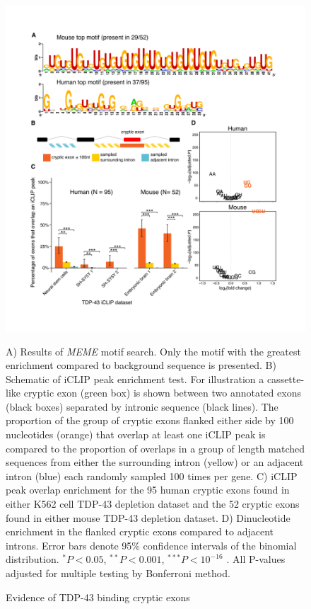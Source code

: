 \begin{figure}[h!]
	\begin{center}
		\includegraphics[width=14cm]{Figures/03_cryptic_exons/Figure_2_motif_iCLIP.png} 
	\end{center}
	\caption{Evidence of TDP-43 binding cryptic exons}
		A) Results of \emph{MEME} motif search. Only the motif with the greatest enrichment compared to background sequence is presented. B) Schematic of iCLIP peak enrichment test. For illustration a cassette-like cryptic exon (green box) is shown between two annotated exons (black boxes) separated by intronic sequence (black lines). The proportion of the group of cryptic exons flanked either side by 100 nucleotides (orange) that overlap at least one iCLIP peak is compared to the proportion of overlaps in a group of length matched sequences from either the surrounding intron (yellow) or an adjacent intron (blue) each randomly sampled 100 times per gene. C) iCLIP peak overlap enrichment for the 95 human cryptic exons found in either K562 cell TDP-43 depletion dataset and the 52 cryptic exons found in either mouse TDP-43 depletion dataset. D) Dinucleotide enrichment in the flanked cryptic exons compared to adjacent introns. Error bars denote 95\% confidence intervals of the binomial distribution. $^* P < 0.05 $, $^{**} P < 0.001$, $^{***} P < 10^{-16}$ . All P-values adjusted for multiple testing by Bonferroni method.
\end{figure}


